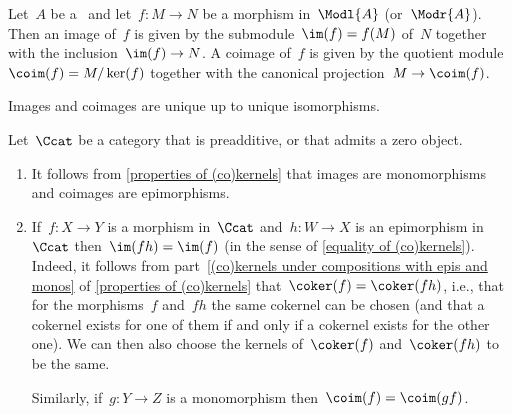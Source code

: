 \begin{example*}
  Let~$A$ be a~{\kalg} and let~$f \colon M \to N$ be a morphism in~$\Modl{A}$ (or~$\Modr{A}$).
  Then an image of~$f$ is given by the submodule~$\im(f) = f(M)$ of~$N$ together with the inclusion~$\im(f) \to N$.
  A coimage of~$f$ is given by the quotient module~$\coim(f) = M/\ker(f)$ together with the canonical projection~$M \to \coim(f)$.
\end{example*}


\begin{remarknonum}
  Images and coimages are unique up to unique isomorphisms.
\end{remarknonum}


\begin{remark*}
  \label{(co)images and monos and epis}
  Let~$\Ccat$ be a category that is preadditive, or that admits a zero object.
  \begin{enumerate}
    \item
      It follows from \cref{properties of (co)kernels} that images are monomorphisms and coimages are epimorphisms.
    \item
      If~$f \colon X \to Y$ is a morphism in~$\Ccat$ and~$h \colon W \to X$ is an epimorphism in~$\Ccat$ then~$\im(fh) = \im(f)$ (in the sense of \cref{equality of (co)kernels}).
      Indeed, it follows from part~\ref*{(co)kernels under compositions with epis and monos} of \cref{properties of (co)kernels} that~$\coker(f) = \coker(fh)$, i.e., that for the morphisms~$f$ and~$fh$ the same cokernel can be chosen (and that a cokernel exists for one of them if and only if a cokernel exists for the other one).
      We can then also choose the kernels of~$\coker(f)$ and~$\coker(fh)$ to be the same.
      
      Similarly, if~$g \colon Y \to Z$ is a monomorphism then~$\coim(f) = \coim(gf)$.
  \end{enumerate}
\end{remark*}


